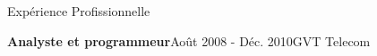 \documentclass{resume}
\begin{document}
\begin{rSection}{Expérience Profissionnelle}
    \begin{rSubsection}{\bf Analyste et programmeur}{Août 2008 - Déc. 2010}{GVT Telecom}{}

\end{rSubsection}
\end{rSection}
\end{document}

